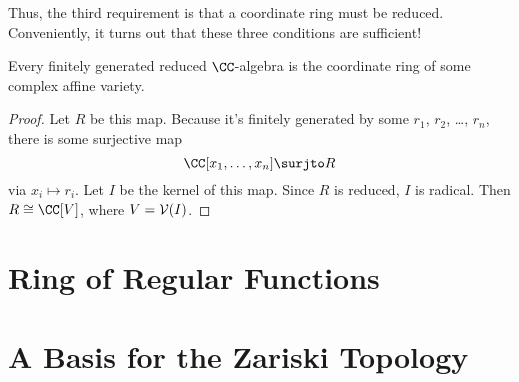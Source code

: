 \documentclass[11pt]{scrreprt}
\begin{document}
Thus, the third requirement is that a coordinate ring must be reduced.
Conveniently, it turns out that these three conditions are sufficient!
\begin{theorem}
	Every finitely generated reduced $\CC$-algebra is the coordinate
	ring of some complex affine variety.
\end{theorem}
\begin{proof}
	Let $R$ be this map.
	Because it's finitely generated by some $r_1$, $r_2$, \dots, $r_n$,
	there is some surjective map
	\[ \CC[x_1, \dots, x_n] \surjto R \]
	via $x_i \mapsto r_i$.
	Let $I$ be the kernel of this map.
	Since $R$ is reduced, $I$ is radical.
	Then $R \cong \CC[V]$, where $V = \mathcal V(I)$.
\end{proof}


\section{Ring of Regular Functions}

\section{A Basis for the Zariski Topology}
\end{document}

